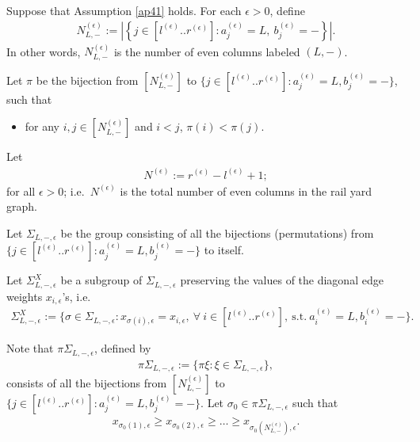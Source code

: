 \documentclass[11pt]{amsart}
\theoremstyle{plain}
\theoremstyle{definition}
\theoremstyle{remark}
\newcommand\si{\sigma}
\numberwithin{equation}{section}
\numberwithin{theorem}{section}
\numberwithin{figure}{section}
\begin{document}
Suppose that Assumption \ref{ap41} holds. For each $\epsilon>0$, define
\begin{eqnarray*}
N_{L,-}^{(\epsilon)}:=\left|\left\{j\in\left[l^{(\epsilon)}..r^{(\epsilon)}\right]:a_j^{(\epsilon)}=L,\ b_j^{(\epsilon)}=-\right\}\right|.
\end{eqnarray*}
In other words, $N_{L,-}^{(\epsilon)}$ is the number of even columns labeled $(L,-)$.

Let $\pi$ be the bijection from $\left[N_{L,-}^{(\epsilon)}\right]$ to $\{j\in[l^{(\epsilon)}..r^{(\epsilon)}]:a_j^{(\epsilon)}=L,b_j^{(\epsilon)}=-\}$, such that
\begin{itemize}
    \item for any $i,j\in\left[N_{L,-}^{(\epsilon)}\right]$ and $i<j$, $\pi(i)<\pi(j)$.
\end{itemize}

Let
\begin{align}
N^{(\epsilon)}:=r^{(\epsilon)}-l^{(\epsilon)}+1;\label{dne}
\end{align}
for all $\epsilon>0$; i.e.~$N^{(\epsilon)}$ is the total number of even columns in the rail yard graph.

Let $\Sigma_{L,-,\epsilon}$ be the group consisting of all the bijections (permutations) from $\{j\in[l^{(\epsilon)}..r^{(\epsilon)}]:a_j^{(\epsilon)}=L,b_j^{(\epsilon)}=-\}$ to itself. 



Let $\Sigma_{L,-,\epsilon}^X$ be a subgroup of $\Sigma_{L,-,\epsilon}$ preserving the values of the diagonal edge weights $x_{i,\epsilon}$'s, i.e.
\begin{eqnarray*}
\Sigma_{L,-,\epsilon}^X:=\{\si\in \Sigma_{L,-,\epsilon}:x_{\si(i),\epsilon}=x_{i,\epsilon},\ \forall\ i\in[l^{(\epsilon)}..  r^{(\epsilon)}],\ \mathrm{s.t.}\ a_i^{(\epsilon)}=L,b_i^{(\epsilon)}=-\}.
\end{eqnarray*}


Note that $\pi\Sigma_{L,-,\epsilon}$, defined by
\begin{eqnarray}
\pi\Sigma_{L,-,\epsilon}:=\{\pi\xi:\xi\in \Sigma_{L,-,\epsilon}\},\label{dps}
\end{eqnarray}
consists of all the bijections from $\left[N_{L,-}^{(\epsilon)}\right]$ to $\{j\in[l^{(\epsilon)}..r^{(\epsilon)}]:a_j^{(\epsilon)}=L,b_j^{(\epsilon)}=-\}$.
Let $\sigma_0\in\pi\Sigma_{L,-,\epsilon}$ such that
\begin{eqnarray}
x_{\si_0(1),\epsilon}\geq x_{\si_0(2),\epsilon}\geq\ldots\geq x_{\si_0\left(N_{L,-}^{(\epsilon)}\right),\epsilon}.\label{sz}
\end{eqnarray}
\end{document}
